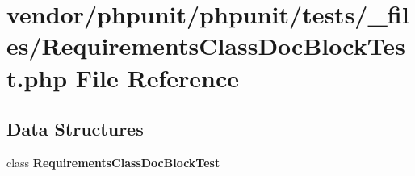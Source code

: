 \section{vendor/phpunit/phpunit/tests/\+\_\+files/\+Requirements\+Class\+Doc\+Block\+Test.php File Reference}
\label{_requirements_class_doc_block_test_8php}
\subsection*{Data Structures}
\begin{DoxyCompactItemize}
\item 
class {\bf Requirements\+Class\+Doc\+Block\+Test}
\end{DoxyCompactItemize}
